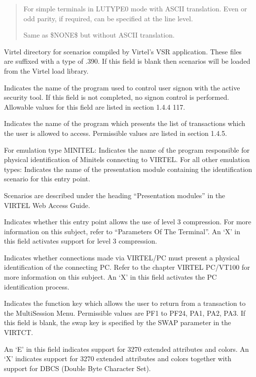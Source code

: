 \documentclass[letterpaper,10pt,english]{sphinxmanual}
\begin{document}
\begin{description}
\begin{quote}
\begin{description}
\sphinxAtStartPar
For simple terminals in LUTYPE0 mode with ASCII translation. Even or odd parity, if required, can be specified at the line level.

\sphinxAtStartPar
Same as \$NONE\$ but without ASCII translation.

\end{description}
\end{quote}

\sphinxAtStartPar
Virtel directory for scenarios compiled by Virtel’s VSR application. These files are suffixed with a type of .390. If this field is blank then scenarios will be loaded from the Virtel load library.

\sphinxAtStartPar
Indicates the name of the program used to control user sign\sphinxhyphen{}on with the active security tool. If this field is not completed, no sign\sphinxhyphen{}on control is performed. Allowable values for this field are listed in section 1.4.4 117.

\sphinxAtStartPar
Indicates the name of the program which presents the list of transactions which the user is allowed to access. Permissible values are listed in section 1.4.5.

\sphinxAtStartPar
For emulation type MINITEL: Indicates the name of the program responsible for physical identification of Minitels connecting to VIRTEL. For all other emulation types: Indicates the name of the presentation module containing the identification scenario for this entry point.

\sphinxAtStartPar
Scenarios are described under the heading “Presentation modules” in the VIRTEL Web Access Guide.

\sphinxAtStartPar
Indicates whether this entry point allows the use of level 3 compression. For more information on this subject, refer to “Parameters Of The Terminal”. An ‘X’ in this field activates support for level 3 compression.

\sphinxAtStartPar
Indicates whether connections made via VIRTEL/PC must present a physical identification of the connecting PC. Refer to the chapter VIRTEL PC/VT100 for more information on this subject. An ‘X’ in this field activates the PC identification process.

\sphinxAtStartPar
Indicates the function key which allows the user to return from a transaction to the Multi\sphinxhyphen{}Session Menu. Permissible values are PF1 to PF24, PA1, PA2, PA3. If this field is blank, the swap key is specified by the SWAP parameter in the VIRTCT.

\sphinxAtStartPar
An ‘E’ in this field indicates support for 3270 extended attributes and colors. An ‘X’ indicates support for 3270 extended attributes and colors together with support for DBCS (Double Byte Character Set).

\end{description}
\end{document}
